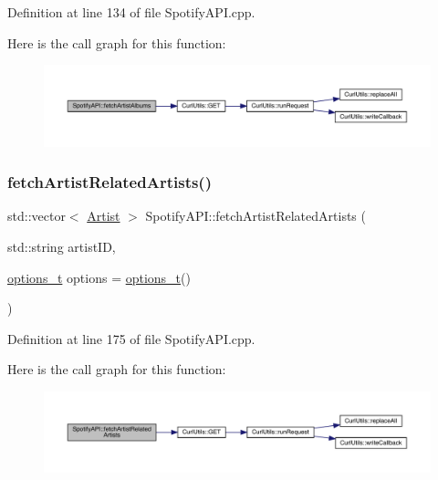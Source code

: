 Definition at line 134 of file Spotify\+A\+P\+I.\+cpp.

Here is the call graph for this function\+:
\nopagebreak
\begin{figure}[H]
\begin{center}
\leavevmode
\includegraphics[width=350pt]{class_spotify_a_p_i_a565dbf6b925da78ef7ef355447b61a9f_cgraph}
\end{center}
\end{figure}
\mbox{\label{class_spotify_a_p_i_a1160dfb028f8d35e044016bfde9249db}} 
\subsubsection{\texorpdfstring{fetch\+Artist\+Related\+Artists()}{fetchArtistRelatedArtists()}}
{\footnotesize\ttfamily std\+::vector$<$ \mbox{\hyperlink{class_artist}{Artist}} $>$ Spotify\+A\+P\+I\+::fetch\+Artist\+Related\+Artists (\begin{DoxyParamCaption}\item[{std\+::string}]{artist\+ID,  }\item[{\mbox{\hyperlink{_spotify_a_p_i_8h_a0ff5cac1a4007bb330b7d9939650c283}{options\+\_\+t}}}]{options = {\ttfamily \mbox{\hyperlink{_spotify_a_p_i_8h_a0ff5cac1a4007bb330b7d9939650c283}{options\+\_\+t}}()} }\end{DoxyParamCaption})}



Definition at line 175 of file Spotify\+A\+P\+I.\+cpp.

Here is the call graph for this function\+:
\nopagebreak
\begin{figure}[H]
\begin{center}
\leavevmode
\includegraphics[width=350pt]{class_spotify_a_p_i_a1160dfb028f8d35e044016bfde9249db_cgraph}
\end{center}
\end{figure}
\mbox{\label{class_spotify_a_p_i_af0dbdda3a69fea10e88175e033884c8a}} 
